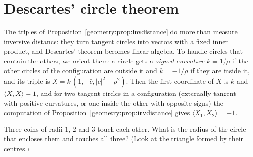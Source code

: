 \section{Descartes' circle theorem}

The triples of Proposition~\ref{geometry:prop:invdistance} do more than measure inversive distance: they turn tangent circles into vectors with a
fixed inner product, and Descartes' theorem becomes linear algebra. To handle circles that contain the others, we orient them: a circle
gets a \emph{signed curvature} $k=1/\rho$ if the other circles of the configuration are outside it and $k=-1/\rho$ if they are inside it, and
its triple is $X=k\,(1,-\bar c,|c|^2-\rho^2)$. Then the first coordinate of $X$ is $k$ and $\langle X,X\rangle=1$, and for two tangent circles
in a configuration (externally tangent with positive curvatures, or one inside the other with opposite signs) the computation of
Proposition~\ref{geometry:prop:invdistance} gives $\langle X_1,X_2\rangle=-1$.

\begin{think}
Three coins of radii $1$, $2$ and $3$ touch each other. What is the radius of the circle that encloses them and touches all three? (Look at the
triangle formed by their centres.)
\end{think}

